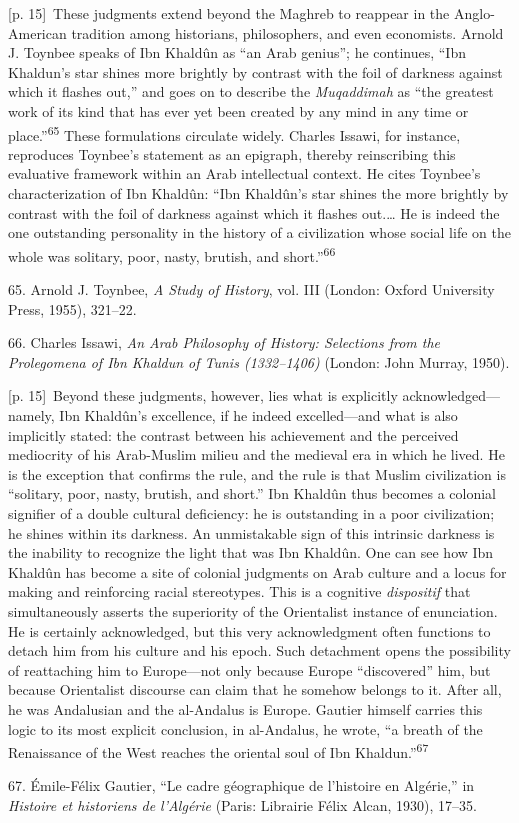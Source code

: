 \documentclass[10pt,a4paper]{article}
\begin{document}
{\scriptsize\color{gray} [p. 15]}\ These judgments extend beyond the Maghreb to reappear in the Anglo-American tradition among historians, philosophers, and even economists. Arnold J. Toynbee speaks of Ibn Khaldûn as “an Arab genius”; he continues, “Ibn Khaldun’s star shines more brightly by contrast with the foil of darkness against which it flashes out,” and goes on to describe the \textit{Muqaddimah} as “the greatest work of its kind that has ever yet been created by any mind in any time or place.”\nobreak\textsuperscript{65} These formulations circulate widely. Charles Issawi, for instance, reproduces Toynbee’s statement as an epigraph, thereby reinscribing this evaluative framework within an Arab intellectual context. He cites Toynbee’s characterization of Ibn Khaldûn: “Ibn Khaldûn’s star shines the more brightly by contrast with the foil of darkness against which it flashes out.… He is indeed the one outstanding personality in the history of a civilization whose social life on the whole was solitary, poor, nasty, brutish, and short.”\nobreak\textsuperscript{66}\par{\small 65. Arnold J. Toynbee, \textit{A Study of History}, vol. III (London: Oxford University Press, 1955), 321–22.\par}{\small 66. Charles Issawi, \textit{An Arab Philosophy of History: Selections from the Prolegomena of Ibn Khaldun of Tunis (1332–1406)} (London: John Murray, 1950).\par}
{\scriptsize\color{gray} [p. 15]}\ Beyond these judgments, however, lies what is explicitly acknowledged—namely, Ibn Khaldûn’s excellence, if he indeed excelled—and what is also implicitly stated: the contrast between his achievement and the perceived mediocrity of his Arab-Muslim milieu and the medieval era in which he lived. He is the exception that confirms the rule, and the rule is that Muslim civilization is “solitary, poor, nasty, brutish, and short.” Ibn Khaldûn thus becomes a colonial signifier of a double cultural deficiency: he is outstanding in a poor civilization; he shines within its darkness. An unmistakable sign of this intrinsic darkness is the inability to recognize the light that was Ibn Khaldûn. One can see how Ibn Khaldûn has become a site of colonial judgments on Arab culture and a locus for making and reinforcing racial stereotypes. This is a cognitive \textit{dispositif} that simultaneously asserts the superiority of the Orientalist instance of enunciation. He is certainly acknowledged, but this very acknowledgment often functions to detach him from his culture and his epoch. Such detachment opens the possibility of reattaching him to Europe—not only because Europe “discovered” him, but because Orientalist discourse can claim that he somehow belongs to it. After all, he was Andalusian and the al-Andalus is Europe. Gautier himself carries this logic to its most explicit conclusion, in al-Andalus, he wrote, “a breath of the Renaissance of the West reaches the oriental soul of Ibn Khaldun.”\nobreak\textsuperscript{67}\par{\small 67. Émile-Félix Gautier, “Le cadre géographique de l’histoire en Algérie,” in \textit{Histoire et historiens de l’Algérie} (Paris: Librairie Félix Alcan, 1930), 17–35.\par}
\end{document}
